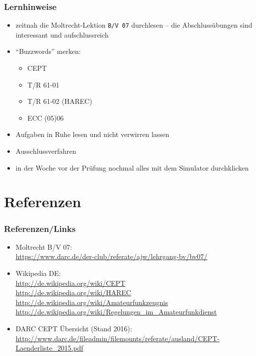 \begin{frame}
  \frametitle{Lernhinweise}

  \begin{itemize}
    \item zeitnah die Moltrecht-Lektion \texttt{B/V 07} durchlesen -- die
      Abschlussübungen sind interessant und aufschlussreich
    \item ``Buzzwords'' merken:
      \begin{itemize}
        \item CEPT
        \item T/R 61-01
        \item T/R 61-02 (HAREC)
        \item ECC (05)06
      \end{itemize}
    \item Aufgaben in Ruhe lesen und nicht verwirren lassen
    \item Ausschlussverfahren
    \item in der Woche vor der Prüfung nochmal alles mit dem Simulator durchklicken
  \end{itemize}

\end{frame}

\section{Referenzen}

\begin{frame}
  \frametitle{Referenzen/Links}

  \footnotesize
  \begin{itemize}
    \item Moltrecht B/V 07: \\
      \url{https://www.darc.de/der-club/referate/ajw/lehrgang-bv/bv07/}
    \item Wikipedia DE: \\
      \url{http://de.wikipedia.org/wiki/CEPT} \\
      \url{http://de.wikipedia.org/wiki/HAREC} \\
      \url{http://de.wikipedia.org/wiki/Amateurfunkzeugnis} \\
      \url{http://de.wikipedia.org/wiki/Regelungen_im_Amateurfunkdienst} \\
    \item DARC CEPT Übersicht (Stand 2016): \\
      \url{http://www.darc.de/fileadmin/filemounts/referate/ausland/CEPT-Laenderliste_2015.pdf}
  \end{itemize}

\end{frame}


